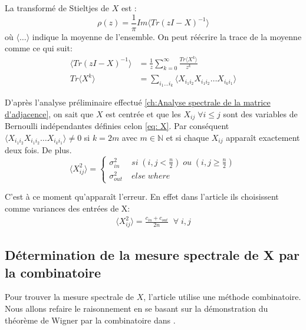 La transformé de Stieltjes de $X$ est :
\begin{equation}
	\rho(z) = \frac{1}{\pi} Im\langle Tr(zI - X)^{-1}\rangle
\end{equation}
où $\langle \dots \rangle$ indique la moyenne de l'ensemble.
On peut réécrire la trace de la moyenne comme ce qui suit: 
\begin{align}
	\langle Tr(zI - X)^{-1}\rangle &= \frac{1}{z}\sum_{k=0}^{\infty} \frac{Tr\langle X^k\rangle}{z^k} \\
	Tr\langle X^k\rangle &= \sum_{i_1\dots i_k}\langle X_{i_1i_2}X_{i_1i_2}\dots X_{i_ki_1}\rangle \label{eq: trace Xk}
\end{align}

D'après l'analyse préliminaire effectué \autoref{ch:Analyse spectrale de la matrice d'adjacence}, on sait que $X$ est centrée et que les $X_{ij} \; \forall i\leq j$ sont des variables de Bernoulli indépendantes définies celon \eqref{eq: X}.
Par conséquent $\langle X_{i_1i_2}X_{i_1i_2}\dots X_{i_ki_1}\rangle \neq 0$ si $k = 2m$ avec $m\in \mathbb{N}$ et si chaque $X_{ij}$ apparaît exactement deux fois.
De plus.
\begin{equation}
	\langle X_{ij}^2\rangle = \left\{
	\begin{array}{lr}
		\sigma_{in}^2  &\; si \; (i,j < \frac{n}{2}) \; ou \; (i,j \ge \frac{n}{2}) \\
		\sigma_{out}^2 &\; else \; where
	\end{array}
\right.\nonumber
\end{equation}

C'est à ce moment qu’apparaît l'erreur.  
En effet dans l'article ils choisissent comme variances des entrées de X: 
\begin{align*}
	\langle X_{ij}^2 \rangle = \frac{c_{in} + c_{out}}{2n} \;\; \forall \; i,j
\end{align*}
\subsection{Détermination de la mesure spectrale de X par la combinatoire}
Pour trouver la mesure spectrale de $X$, l'article utilise une méthode combinatoire.
Nous allons refaire le raisonnement en se basant sur la démonstration du théorème de Wigner par la combinatoire dans \cite[Introduction aux matrices aléatoires]{wigner}.\\
